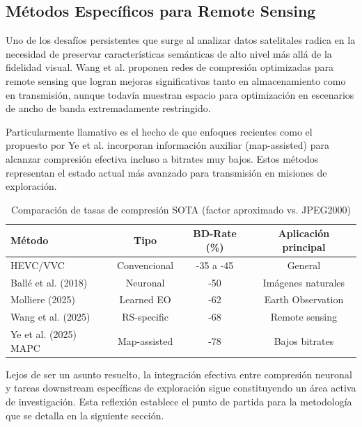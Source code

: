 \subsection{Métodos Específicos para Remote Sensing}

Uno de los desafíos persistentes que surge al analizar datos satelitales radica en la necesidad de preservar características semánticas de alto nivel más allá de la fidelidad visual. Wang et al. \cite{Wang2025_RS_Compression} proponen redes de compresión optimizadas para remote sensing que logran mejoras significativas tanto en almacenamiento como en transmisión, aunque todavía muestran espacio para optimización en escenarios de ancho de banda extremadamente restringido.

Particularmente llamativo es el hecho de que enfoques recientes como el propuesto por Ye et al. \cite{Ye2025_MAPC} incorporan información auxiliar (map-assisted) para alcanzar compresión efectiva incluso a bitrates muy bajos. Estos métodos representan el estado actual más avanzado para transmisión en misiones de exploración.

\begin{table}[h]
\centering
\caption{Comparación de tasas de compresión SOTA (factor aproximado vs. JPEG2000)}
\label{tab:comparacion_compresion}
\begin{tabular}{lccc}
\hline
\textbf{Método} & \textbf{Tipo} & \textbf{BD-Rate (\%)} & \textbf{Aplicación principal} \\
\hline
HEVC/VVC & Convencional & -35 a -45 & General \\
Ballé et al. (2018) & Neuronal & -50 & Imágenes naturales \\
Molliere (2025) & Learned EO & -62 & Earth Observation \\
Wang et al. (2025) & RS-specific & -68 & Remote sensing \\
Ye et al. (2025) MAPC & Map-assisted & -78 & Bajos bitrates \\
\hline
\end{tabular}
\end{table}

Lejos de ser un asunto resuelto, la integración efectiva entre compresión neuronal y tareas downstream específicas de exploración sigue constituyendo un área activa de investigación. Esta reflexión establece el punto de partida para la metodología que se detalla en la siguiente sección.
